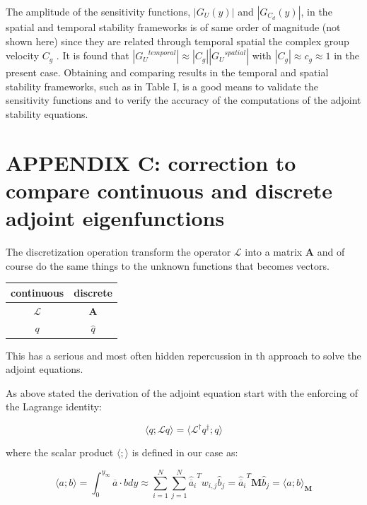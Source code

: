 The amplitude of the sensitivity functions, $|G_{U} ( y)|$ and $|G_{C_d} (y)|$, in the spatial and temporal
stability frameworks is of same order of magnitude (not shown here) since they are related through
temporal spatial the complex group velocity $C_g$ . It is found that $|{G_U}^{temporal}| \approx |C_g ||{G_U}^{spatial}|$ with $|C_g | \approx c_g \approx 1$ in the
present case.
Obtaining and comparing results in the temporal and spatial stability frameworks, such as in
Table I, is a good means to validate the sensitivity functions and to verify the accuracy of the
computations of the adjoint stability equations.


\section*{APPENDIX C: correction to compare continuous and discrete adjoint eigenfunctions}

The discretization operation transform the operator $\mathcal{L}$ into a matrix $\mathbf{A}$ and of course do the same things to the unknown functions that becomes vectors.

\begin{tabular}{|c|c|}
	\hline 
	continuous & discrete \\ 
	\hline 
	$\mathcal{L}$ & $\mathbf{A}$ \\ 
	\hline 
	$q$ & $\hat{q}$ \\ 
	\hline 
\end{tabular} 

This has a serious and most often hidden repercussion in th approach to solve the adjoint equations.

As above stated the derivation of the adjoint equation start with the enforcing of the Lagrange identity:

\begin{equation}
\langle q; \mathcal{L} q \rangle = \langle {\mathcal{L}}^{\dagger} q^{\dagger} ; q \rangle
\end{equation}

where the scalar product $ \langle ;\rangle$ is defined in our case as:

\begin{equation}
\langle a ; b\rangle = \int_{0}^{y_{\infty}} \overline{a} \cdot b dy \approx \sum_{i=1}^N \sum_{j=1}^N {\hat{\overline{a}}_i}^T w_{i,j} {\hat{b}_j} = {\hat{\overline{a}}_i}^T \mathbf{M} {\hat{b}_j} =  \langle a ; b\rangle_{\mathbf{M}}
\label{eq:scalr_prod}
\end{equation}

